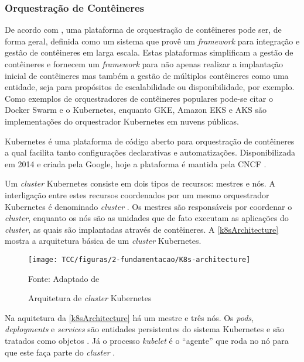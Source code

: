 \subsubsection{Orquestração de Contêineres}

De acordo com , uma plataforma de orquestração de contêineres pode ser, de forma geral, definida como um sistema que provê um \textit{framework} para integração e gestão de contêineres em larga escala.  Estas plataformas simplificam a gestão de contêineres e fornecem um \textit{framework} para não apenas realizar a implantação inicial de contêineres mas também a gestão de múltiplos contêineres como uma entidade, seja para propósitos de escalabilidade ou disponibilidade, por exemplo. Como exemplos de orquestradores de contêineres populares pode-se citar o Docker Swarm e o Kubernetes, enquanto  \ac{GKE}, \ac{Amazon EKS} e \ac{AKS} são implementações do orquestrador Kubernetes em nuvens públicas.


Kubernetes é uma plataforma de código aberto para orquestração de contêineres a qual facilita tanto configurações declarativas e automatizações. Disponibilizada em 2014 e criada pela Google, hoje a plataforma é mantida pela \ac{CNCF} \cite{aboutkubernetes}.

Um \textit{cluster} Kubernetes consiste em dois tipos de recursos: mestres e nós. A interligação entre estes recursos coordenados por um mesmo orquestrador Kubernetes é denominado \textit{cluster} \cite{minikubeCluster}. Os mestres são responsáveis por coordenar o \textit{cluster}, enquanto os nós são as unidades que de fato executam as aplicações do \textit{cluster}, as quais são implantadas através de contêineres. A \autoref{k8sArchitecture} mostra a arquitetura básica de um \textit{cluster} Kubernetes.

\begin{figure}[!htpb]
	\centering
	\caption{Arquitetura de \textit{cluster} Kubernetes}
    \texttt{[image: TCC/figuras/2-fundamentacao/K8s-architecture]}
    
	Fonte: Adaptado de \cite{minikubeCluster}
 	\label{k8sArchitecture}
\end{figure}

Na aquitetura da \autoref{k8sArchitecture} há um mestre e três nós. Os \textit{pods}, \textit{deployments} e \textit{services} são entidades persistentes do sistema Kubernetes e são tratados como objetos \cite{kubernetesObjects}. Já o processo \textit{kubelet} é o ``agente'' que roda no nó para que este faça parte do \textit{cluster} \cite{kubernetesKubelet}.

